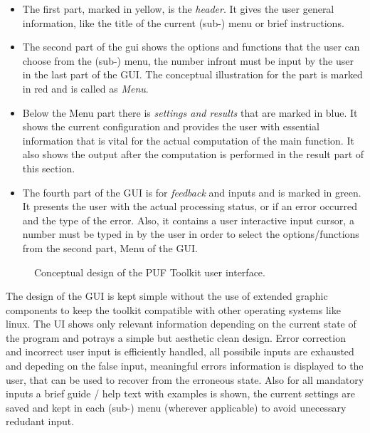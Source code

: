 \begin{itemize}
	\item The first part, marked in yellow, is the \emph{header}. It gives the user general information, like the title of the current (sub-) menu or brief instructions.
	\item The second part of the gui shows the options and functions that the user can choose from the (sub-) menu, the number infront must be input by the user in the last part of the GUI. The conceptual illustration for the part is marked in red and is called as \emph{Menu}.
	\item Below the Menu part there is \emph{settings and results} that are marked in blue. It shows the current configuration and provides the user with essential information that is vital for the actual computation of the main function. It also shows the output after the computation is performed in the result part of this section.
	\item The fourth part of the GUI is for \emph{feedback} and inputs and is marked in green. It presents the user with the actual processing status, or if an error occurred and the type of the error. Also, it contains a user interactive input cursor, a number must be typed in by the user in order to select the options/functions from the second part, Menu of the GUI.
\end{itemize}

\begin{figure}
\centering
{}
\caption{Conceptual design of the PUF Toolkit user interface.}
\label{img:gui_design}
\end{figure}

The design of the GUI is kept simple without the use of extended graphic components to keep the toolkit compatible with other operating systems like linux. The UI shows only relevant information depending on the current state of the program and potrays a simple but aesthetic clean design. Error correction and incorrect user input is efficiently handled, all possibile inputs are exhausted and depeding on the false input, meaningful errors information is displayed to the user, that can be used to
recover from the erroneous state. Also for all mandatory inputs a brief guide / help text with examples is shown, the current settings are saved and kept in each (sub-) menu (wherever applicable) to avoid unecessary redudant input.\\


